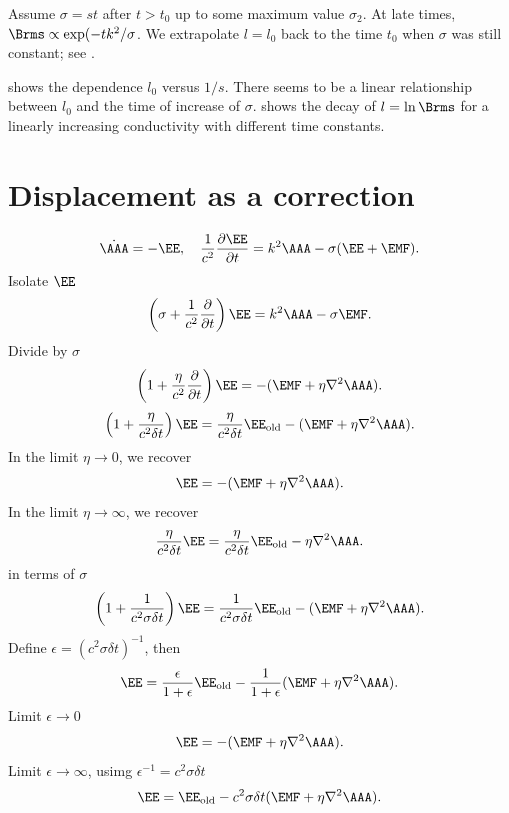 \documentclass[twocolumn]{article}
\begin{document}
Assume $\sigma=st$ after $t>t_0$ up to some maximum value $\sigma_2$.
At late times, $\Brms\propto\exp(-t k^2/\sigma$.
We extrapolate $l=l_0$ back to the time $t_0$ when $\sigma$ was still constant;
see .

 shows the dependence $l_0$ versus $1/s$.
There seems to be a linear relationship between $l_0$ and the
time of increase of $\sigma$.
 shows the decay of $l=\ln\Brms$ for a
linearly increasing conductivity with different time constants.

\section{Displacement as a correction}

\begin{equation}
\dot{\AAA}=-\EE,\quad
{1\over c^2}{\partial\EE\over\partial t}=k^2\AAA-\sigma(\EE+\EMF).
\end{equation}
Isolate $\EE$
\begin{equation}
\left(\sigma+{1\over c^2}{\partial\over\partial t}\right)\EE=k^2\AAA-\sigma\EMF.
\end{equation}
Divide by $\sigma$
\begin{equation}
\left(1+{\eta\over c^2}{\partial\over\partial t}\right)\EE=-(\EMF+\eta\nabla^2\AAA).
\end{equation}
\begin{equation}
\left(1+{\eta\over c^2\delta t}\right)\EE=
{\eta\over c^2\delta t}\EE_{\rm old}
-(\EMF+\eta\nabla^2\AAA).
\label{FirstOrder}
\end{equation}
In the limit $\eta\to0$, we recover
\begin{equation}
\EE=-(\EMF+\eta\nabla^2\AAA).
\end{equation}
In the limit $\eta\to\infty$, we recover
\begin{equation}
{\eta\over c^2\delta t}\EE=
{\eta\over c^2\delta t}\EE_{\rm old}
-\eta\nabla^2\AAA.
\end{equation}
 in terms of $\sigma$
\begin{equation}
\left(1+{1\over c^2\sigma\delta t}\right)\EE=
{1\over c^2\sigma\delta t}\EE_{\rm old}
-(\EMF+\eta\nabla^2\AAA).
\end{equation}
Define $\epsilon=(c^2\sigma\delta t)^{-1}$, then
\begin{equation}
\EE={\epsilon\over1+\epsilon}\EE_{\rm old}
-{1\over1+\epsilon}(\EMF+\eta\nabla^2\AAA).
\end{equation}
Limit $\epsilon\to0$
\begin{equation}
\EE=-(\EMF+\eta\nabla^2\AAA).
\end{equation}
Limit $\epsilon\to\infty$, usimg $\epsilon^{-1}=c^2\sigma\delta t$
\begin{equation}
\EE=\EE_{\rm old}
-c^2\sigma\delta t(\EMF+\eta\nabla^2\AAA).
\end{equation}
\end{document}
